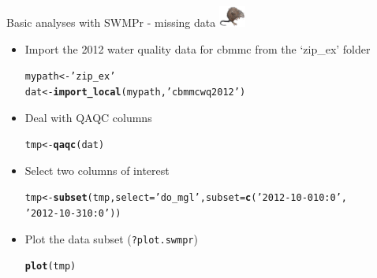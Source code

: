 \documentclass[xcolor=dvipsnames]{beamer}\usepackage[]{graphicx}\usepackage[]{color}
\makeatletter
\newcommand{\hlstr}[1]{\textcolor[rgb]{0.192,0.494,0.8}{#1}}%
\newcommand{\hlstd}[1]{\textcolor[rgb]{0.345,0.345,0.345}{#1}}%
\newcommand{\hlkwb}[1]{\textcolor[rgb]{0.69,0.353,0.396}{#1}}%
\newcommand{\hlkwc}[1]{\textcolor[rgb]{0.333,0.667,0.333}{#1}}%
\newcommand{\hlkwd}[1]{\textcolor[rgb]{0.737,0.353,0.396}{\textbf{#1}}}%
\newenvironment{kframe}{%
 \def\at@end@of@kframe{}%
 \ifinner\ifhmode%
  \def\at@end@of@kframe{\end{minipage}}%
  \begin{minipage}{\columnwidth}%
 \fi\fi%
 \def\FrameCommand##1{\hskip\@totalleftmargin \hskip-\fboxsep
 \colorbox{shadecolor}{##1}\hskip-\fboxsep
     \hskip-\linewidth \hskip-\@totalleftmargin \hskip\columnwidth}%
 \MakeFramed {\advance\hsize-\width
   \@totalleftmargin\z@ \linewidth\hsize
   \@setminipage}}%
 {\par\unskip\endMakeFramed%
 \at@end@of@kframe}
\newenvironment{knitrout}{}{} %
\makeatother
\begin{document}
\begin{frame}[fragile]{Basic analyses with SWMPr - missing data \includegraphics[width = 0.065\textwidth]{imgs/swmprat.png}}
\begin{itemize}
\item {}
Import the 2012 water quality data for cbmmc from the `zip\_ex' folder
\begin{knitrout}\scriptsize
{}\color{fgcolor}\begin{kframe}
\begin{alltt}
\hlstd{mypath} \hlkwb{<-} \hlstr{'zip_ex'}
\hlstd{dat} \hlkwb{<-} \hlkwd{import_local}\hlstd{(mypath,} \hlstr{'cbmmcwq2012'}\hlstd{)}
\end{alltt}
\end{kframe}
\end{knitrout}
\vspace{0.1in}
\item {}
Deal with QAQC columns
\begin{knitrout}\scriptsize
{}\color{fgcolor}\begin{kframe}
\begin{alltt}
\hlstd{tmp} \hlkwb{<-} \hlkwd{qaqc}\hlstd{(dat)}
\end{alltt}
\end{kframe}
\end{knitrout}
\vspace{0.1in}
\item {}
Select two columns of interest
\begin{knitrout}\scriptsize
{}\color{fgcolor}\begin{kframe}
\begin{alltt}
\hlstd{tmp} \hlkwb{<-} \hlkwd{subset}\hlstd{(tmp,} \hlkwc{select} \hlstd{=} \hlstr{'do_mgl'}\hlstd{,} \hlkwc{subset} \hlstd{=} \hlkwd{c}\hlstd{(}\hlstr{'2012-10-01 0:0'}\hlstd{,}
  \hlstr{'2012-10-31 0:0'}\hlstd{))}
\end{alltt}
\end{kframe}
\end{knitrout}
\vspace{0.1in}
\item {}
Plot the data subset (\texttt{?plot.swmpr})
\begin{knitrout}\scriptsize
{}\color{fgcolor}\begin{kframe}
\begin{alltt}
\hlkwd{plot}\hlstd{(tmp)}
\end{alltt}
\end{kframe}
\end{knitrout}
\end{itemize}
\end{frame}
\end{document}
